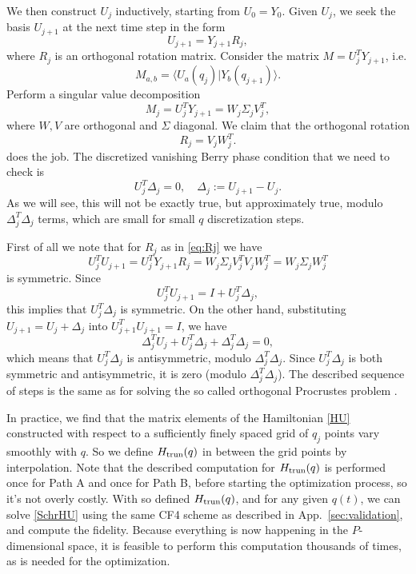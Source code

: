 \documentclass[a4paper,11pt]{article}
\theoremstyle{remark}
\theoremstyle{theorem}
\begin{document}
We then construct $U_j$ inductively, starting from $U_0 = Y_0$. Given $U_j$,
we seek the basis $U_{j + 1}$ at the next time step in the form
\begin{equation}
	U_{j + 1} = Y_{j + 1} R_j,
\end{equation}
where $R_j$ is an orthogonal rotation matrix. Consider the matrix $M = U_j^T
Y_{j + 1}$, i.e.
\begin{equation}
	M_{a, b} = \langle U_a (q_j) |Y_b (q_{j + 1}) \rangle .
\end{equation}
Perform a singular value decomposition
\begin{equation}
	M_j = U_j^T Y_{j + 1} = W_j \Sigma_j V_j^T,
\end{equation}
where $W, V$ are orthogonal and $\Sigma$ diagonal. We claim that the
orthogonal rotation
\begin{equation}
	R_j = V_j W_j^T . \label{eq:Rj}
\end{equation}
does the job. The discretized vanishing Berry phase condition that we need to
check is
\begin{equation}
	U_j^T \Delta_j = 0, \quad \Delta_j := U_{j + 1} - U_j .
\end{equation}
As we will see, this will not be exactly true, but approximately true, modulo
$\Delta_j^T \Delta_j $ terms, which are small for small $q$ discretization
steps.

First of all we note that for $R_j$ as in \eqref{eq:Rj} we have
\begin{equation}
	U_j^T U_{j + 1} = U_j^T Y_{j + 1} R_j = W_j \Sigma_j V_j^T V_j W_j^T = W_j
	\Sigma_j W_j^T
\end{equation}
is symmetric. Since
\begin{equation}
	U_j^T U_{j + 1} = I + U_j^T \Delta_j,
\end{equation}
this implies that $U_j^T \Delta_j$ is symmetric. On the other hand,
substituting $U_{j + 1} = U_j + \Delta_j$ into $U_{j + 1}^T U_{j + 1} = I$, we
have
\begin{equation}
	\Delta_j^T U_j + U_j^T \Delta_j + \Delta_j^T \Delta_j = 0,
\end{equation}
which means that $U_j^T \Delta_j$ is antisymmetric, modulo $\Delta_j^T
\Delta_j $. Since $U_j^T \Delta_j$ is both symmetric and antisymmetric, it is
zero (modulo $\Delta_j^T \Delta_j $). The described sequence of steps is the same as
for solving the so called orthogonal Procrustes problem
{\cite{Schonemann1966,LiuVanderbilt2015}}.

In practice, we find that the matrix elements of the Hamiltonian \eqref{HU}
constructed with respect to a sufficiently finely spaced grid of $q_j$ points
vary smoothly with $q$. So we define $H_{\rm trun}
(q)$ in between the grid points by interpolation. Note that the described computation for $H_{\rm trun}
(q)$
is performed once for Path A and once for Path B, before starting the
optimization process, so it's not overly costly. With so defined
$H_{\rm trun} (q)$, and for any given $q (t)$, we
can solve \eqref{SchrHU} using the same CF4 scheme as described in App.~\ref{sec:validation}, and compute the fidelity. Because everything is now happening in the $P$-dimensional space, it is feasible to perform this computation thousands of times, as is needed for
the optimization.
\end{document}

